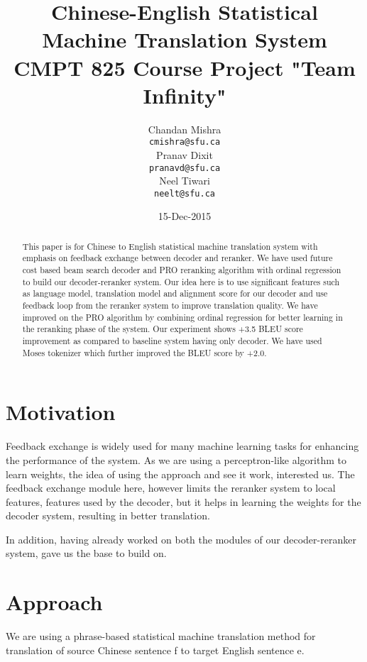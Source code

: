 \documentclass[11pt,letterpaper]{article}
\title{ Chinese-English Statistical Machine Translation System\\
\large CMPT 825 Course Project "Team Infinity"}
\author{Chandan Mishra \\
  {\tt cmishra@sfu.ca} \\\And
  Pranav Dixit \\
  {\tt pranavd@sfu.ca} \\\And
  Neel Tiwari\\
  {\tt neelt@sfu.ca} \\}
\date{15-Dec-2015}
\begin{document}
\maketitle
\begin{abstract}
  This paper is for Chinese to English statistical machine translation system with emphasis on feedback exchange between decoder and reranker. We have used future cost based beam search decoder and PRO reranking algorithm with ordinal regression to build our decoder-reranker system. Our idea here is to use significant features such as language model, translation model and alignment score for our decoder and use feedback loop from the reranker system to improve translation quality. We have improved on the PRO algorithm by combining ordinal regression for better learning in the reranking phase of the system. Our experiment shows +3.5 BLEU score improvement as compared to baseline system having only decoder. We have used Moses tokenizer which further improved the BLEU score by +2.0.
\end{abstract}

\section{Motivation}

Feedback exchange is widely used for many machine learning tasks for enhancing the performance of the system. As we are using a perceptron-like algorithm to learn weights, the idea of using the approach and see it work, interested us. The feedback exchange module here, however limits the reranker system to local features, features used by the decoder, but it helps in learning the weights for the decoder system, resulting in better translation. 

In addition, having already worked on both the modules of our decoder-reranker system, gave us the base to build on.

\section{Approach}

We are using a phrase-based statistical machine translation method for translation of source Chinese sentence f to target English sentence e.
\end{document}
